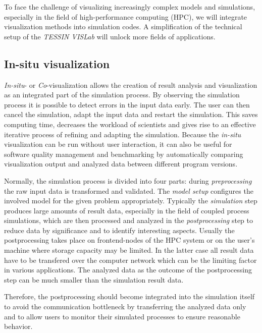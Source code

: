 \documentclass[twocolumn]{svjour3}          %
\begin{document}
To face the challenge of visualizing increasingly complex models and simulations, especially in the field of high-performance computing (HPC), we will integrate visualization methods into simulation codes. A simplification of the technical setup of the \emph{TESSIN VISLab} will unlock more fields of applications.

\subsection{In-situ visualization}
\label{in-situ-visualization}

\emph{In-situ}- or \emph{Co}-visualization allows the creation of result analysis and visualization as an integrated part of the simulation process. By observing the simulation process it is possible to detect errors in the input data early. The user can then cancel the simulation, adapt the input data and restart the simulation. This saves computing time, decreases the workload of scientists and gives rise to an effective iterative process of refining and adapting the simulation. Because the \emph{in-situ} visualization can be run without user interaction, it can also be useful for software quality management and benchmarking by automatically comparing visualization output and analyzed data between different program versions.

Normally, the simulation process is divided into four parts: during \emph{preprocessing} the raw input data is transformed and validated. The \emph{model setup} configures the involved model for the given problem appropriately. Typically the \emph{simulation} step produces large amounts of result data, especially in the field of coupled process simulations, which are then processed and analyzed in the \emph{postprocessing} step to reduce data by significance and to identify interesting aspects. Usually the postprocessing takes place on frontend-nodes of the HPC system or on the user's machine where storage capacity may be limited. In the latter case all result data have to be transfered over the computer network which can be the limiting factor in various applications. The analyzed data as the outcome of the postprocessing step can be much smaller than the simulation result data.

Therefore, the postprocessing should become integrated into the simulation itself to avoid the communication bottleneck by transferring the analyzed data only and to allow users to monitor their simulated processes to ensure reasonable behavior.
\end{document}
